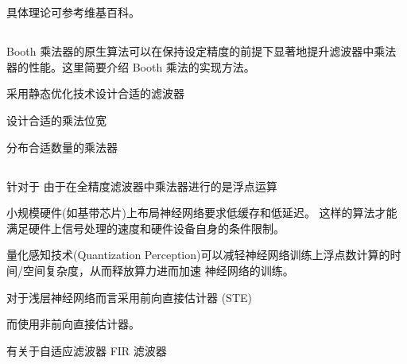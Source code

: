 \section{}

\subsection{}

具体理论可参考维基百科。

\subsection{}

Booth 乘法器的原生算法可以在保持设定精度的前提下显著地提升滤波器中乘法器的性能。这里简要介绍 Booth 乘法的实现方法。


采用静态优化技术设计合适的滤波器

设计合适的乘法位宽


分布合适数量的乘法器

\subsection{}

针对于
由于在全精度滤波器中乘法器进行的是浮点运算

小规模硬件(如基带芯片)上布局神经网络要求低缓存和低延迟。
这样的算法才能满足硬件上信号处理的速度和硬件设备自身的条件限制。

量化感知技术(Quantization Perception)可以减轻神经网络训练上浮点数计算的时间/空间复杂度，从而释放算力进而加速
神经网络的训练。

对于浅层神经网络而言采用前向直接估计器 (STE)

而使用非前向直接估计器。

有关于自适应滤波器 FIR 滤波器
